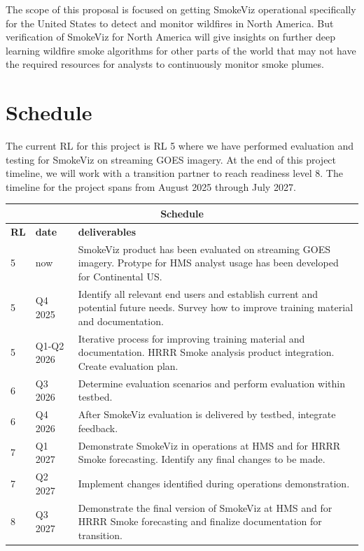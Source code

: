 The scope of this proposal is focused on getting SmokeViz operational specifically for the United States to detect and monitor wildfires in North America. But verification of SmokeViz for North America will give insights on further deep learning wildfire smoke algorithms for other parts of the world that may not have the required resources for analysts to continuously monitor smoke plumes.

\section{Schedule}


The current RL for this project is RL 5 where we have performed evaluation and testing for SmokeViz on streaming GOES imagery. At the end of this project timeline, we will work with a transition partner to reach readiness level 8. The timeline for the project spans from August 2025 through July 2027.


\begin{tabular}{ |p{1cm}|p{3cm}|p{12cm}|  }
 \hline
 \multicolumn{3}{|c|}{\textbf{Schedule}} \\
 \hline
 \textbf{RL} & \textbf{date} & \textbf{deliverables}\\
 \hline
 5 & now & SmokeViz product has been evaluated on streaming GOES imagery. Protype for HMS analyst usage has been developed for Continental US.\\
 \hline
 5 & Q4 2025 & Identify all relevant end users and establish current and potential future needs. Survey how to improve training material and documentation.\\
 \hline
 5 & Q1-Q2 2026 & Iterative process for improving training material and documentation. HRRR Smoke analysis product integration. Create evaluation plan.\\
 \hline
 6 & Q3 2026 & Determine evaluation scenarios and perform evaluation within testbed.\\
 \hline
 6 & Q4 2026 & After SmokeViz evaluation is delivered by testbed, integrate feedback.\\
 \hline
 7 & Q1 2027 & Demonstrate SmokeViz in operations at HMS and for HRRR Smoke forecasting. Identify any final changes to be made.\\
 \hline
 7 & Q2 2027 & Implement changes identified during operations demonstration.\\
 \hline
 8 & Q3 2027 & Demonstrate the final version of SmokeViz at HMS and for HRRR Smoke forecasting and finalize documentation for transition.\\
 \hline
\end{tabular}



